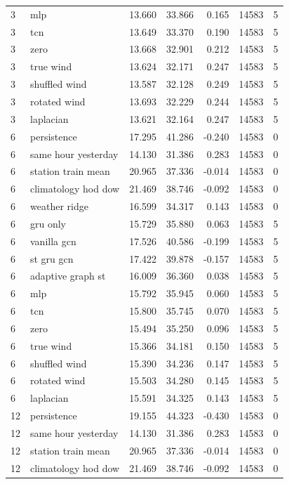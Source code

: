 \begin{tabular}{llrrrrr}
3 & mlp & 13.660 & 33.866 & 0.165 & 14583 & 5 \\
3 & tcn & 13.649 & 33.370 & 0.190 & 14583 & 5 \\
3 & zero & 13.668 & 32.901 & 0.212 & 14583 & 5 \\
3 & true wind & 13.624 & 32.171 & 0.247 & 14583 & 5 \\
3 & shuffled wind & 13.587 & 32.128 & 0.249 & 14583 & 5 \\
3 & rotated wind & 13.693 & 32.229 & 0.244 & 14583 & 5 \\
3 & laplacian & 13.621 & 32.164 & 0.247 & 14583 & 5 \\
6 & persistence & 17.295 & 41.286 & -0.240 & 14583 & 0 \\
6 & same hour yesterday & 14.130 & 31.386 & 0.283 & 14583 & 0 \\
6 & station train mean & 20.965 & 37.336 & -0.014 & 14583 & 0 \\
6 & climatology hod dow & 21.469 & 38.746 & -0.092 & 14583 & 0 \\
6 & weather ridge & 16.599 & 34.317 & 0.143 & 14583 & 0 \\
6 & gru only & 15.729 & 35.880 & 0.063 & 14583 & 5 \\
6 & vanilla gcn & 17.526 & 40.586 & -0.199 & 14583 & 5 \\
6 & st gru gcn & 17.422 & 39.878 & -0.157 & 14583 & 5 \\
6 & adaptive graph st & 16.009 & 36.360 & 0.038 & 14583 & 5 \\
6 & mlp & 15.792 & 35.945 & 0.060 & 14583 & 5 \\
6 & tcn & 15.800 & 35.745 & 0.070 & 14583 & 5 \\
6 & zero & 15.494 & 35.250 & 0.096 & 14583 & 5 \\
6 & true wind & 15.366 & 34.181 & 0.150 & 14583 & 5 \\
6 & shuffled wind & 15.390 & 34.236 & 0.147 & 14583 & 5 \\
6 & rotated wind & 15.503 & 34.280 & 0.145 & 14583 & 5 \\
6 & laplacian & 15.591 & 34.325 & 0.143 & 14583 & 5 \\
12 & persistence & 19.155 & 44.323 & -0.430 & 14583 & 0 \\
12 & same hour yesterday & 14.130 & 31.386 & 0.283 & 14583 & 0 \\
12 & station train mean & 20.965 & 37.336 & -0.014 & 14583 & 0 \\
12 & climatology hod dow & 21.469 & 38.746 & -0.092 & 14583 & 0 \\

\end{tabular}
